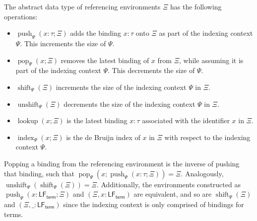 \newcommand{\Hoare}[3]{\set{#1}\ #2\ \set{#3}}
\renewcommand{\Env}{\mathsf{Env}}
\renewcommand{\Pop}[3]{\operatorname{pop}_{#1}\left(#2; #3\right)}
\newcommand{\Push}[3]{\operatorname{push}_{#1}\left(#2; #3\right)}
\newcommand{\Shift}[2]{\operatorname{shift}_{#1}\left(#2\right)}
\newcommand{\Unshift}[2]{\operatorname{unshift}_{#1}\left(#2\right)}
\renewcommand{\Lookup}[2]{\operatorname{lookup}\left(#1; #2\right)}
\renewcommand{\Index}[3]{\operatorname{index}_{#1}\left(#2; #3\right)}
\newcommand{\Indexes}[3]{#1 \rightsquigarrow_{#2} #3}
\newcommand{\IndexesKind}[2]{\Indexes{#1}{{\normalfont\text{K}}}{#2}}
\newcommand{\IndexesType}[2]{\Indexes{#1}{{\normalfont\text{A}}}{#2}}
\newcommand{\IndexesTerm}[2]{\Indexes{#1}{{\normalfont\text{M}}}{#2}}
\newcommand{\LFTerm}{\mathsf{LF}_{\mathsf{term}}}
\newcommand{\LFTypeConst}{\mathsf{LF}_{\mathsf{type\ const}}}
\newcommand{\LFTermConst}{\mathsf{LF}_{\mathsf{term\ const}}}

The abstract data type of referencing environments $\Xi$ has the following operations:
\begin{itemize}
\item
$\Push{\Psi}{x : \tau}{\Xi}$ adds the binding $x : \tau$ onto $\Xi$ as part of the indexing context $\Psi$.
This increments the size of $\Psi$.
\item
$\Pop{\Psi}{x}{\Xi}$ removes the latest binding of $x$ from $\Xi$, while assuming it is part of the indexing context $\Psi$.
This decrements the size of $\Psi$.
\item
$\Shift{\Psi}{\Xi}$ increments the size of the indexing context $\Psi$ in $\Xi$.
\item
$\Unshift{\Psi}{\Xi}$ decrements the size of the indexing context $\Psi$ in $\Xi$.
\item
$\Lookup{x}{\Xi}$ is the latest binding $x : \tau$ associated with the identifier $x$ in $\Xi$.
\item
$\Index{\Psi}{x}{\Xi}$ is the de Bruijn index of $x$ in $\Xi$ with respect to the indexing context $\Psi$.
\end{itemize}
Popping a binding from the referencing environment is the inverse of pushing that binding, such that $\Pop{\Psi}{x}{\Push{\Psi}{x : \tau}{\Xi}} = \Xi$.
Analogously, $\Unshift{\Psi}{\Shift{\Psi}{\Xi}} = \Xi$.
Additionally, the environments constructed as $\Push{\Psi}{x : \LFTerm}{\Xi} $ and $ (\Xi, x : \LFTerm)$ are equivalent, and so are $\Shift{\Psi}{\Xi} $ and $ (\Xi, \_ : \LFTerm)$ since the \LF indexing context is only comprised of bindings for \LF terms.

